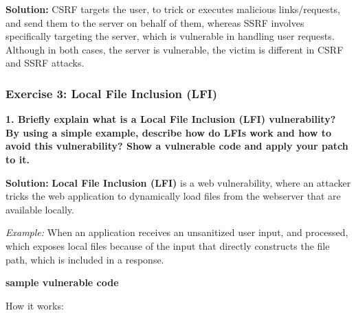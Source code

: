 \textbf{Solution:} CSRF targets the user, to trick or executes malicious
links/requests, and send them to the server on behalf of them, whereas
SSRF involves specifically targeting the server, which is vulnerable in
handling user requests. Although in both cases, the server is
vulnerable, the victim is different in CSRF and SSRF attacks.

\hypertarget{exercise-3-local-file-inclusion-lfi}{%
\subsubsection{Exercise 3: Local File Inclusion
(LFI)}\label{exercise-3-local-file-inclusion-lfi}}

\textbf{1. Briefly explain what is a Local File Inclusion (LFI)
vulnerability? By using a simple example, describe how do LFIs work and
how to avoid this vulnerability? Show a vulnerable code and apply your
patch to it.}

\textbf{Solution:} \textbf{Local File Inclusion (LFI)} is a web
vulnerability, where an attacker tricks the web application to
dynamically load files from the webserver that are available locally.

\emph{Example:} When an application receives an unsanitized user input,
and processed, which exposes local files because of the input that
directly constructs the file path, which is included in a response.

\textbf{sample vulnerable code}

\begin{Shaded}
\begin{Highlighting}[]

     \NormalTok{[}\NormalTok{]}\OtherTok{;}
     \OtherTok{;}
     \OperatorTok{=} \NormalTok{[}\NormalTok{]}\OtherTok{;}
      \OtherTok{;}
     
     \OtherTok{;}
\end{Highlighting}
\end{Shaded}

How it works:

